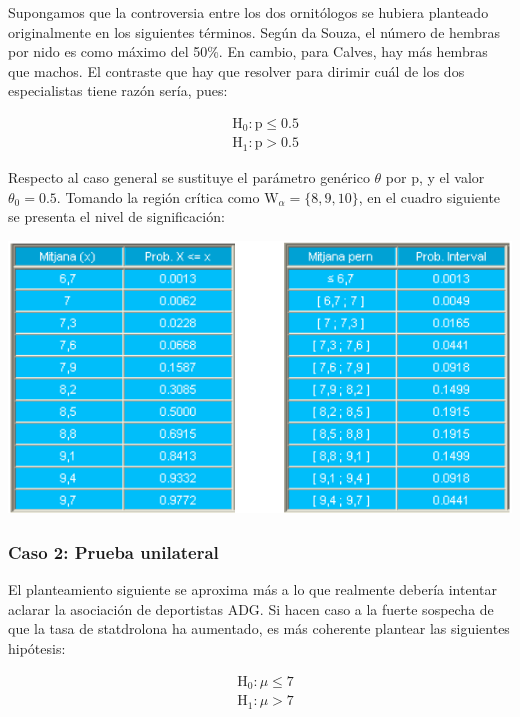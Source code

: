 \documentclass[
]{article}
\begin{document}
Supongamos que la controversia entre los dos ornitólogos se hubiera planteado originalmente en los siguientes términos. Según da Souza, el número de hembras por nido es como máximo del 50\%. En cambio, para Calves, hay más hembras que machos. El contraste que hay que resolver para dirimir cuál de los dos especialistas tiene razón sería, pues:

\[
\begin{aligned}
& \mathrm{H}_{0}: \mathrm{p} \leq 0.5 \\
& \mathrm{H}_{1}: \mathrm{p}>0.5
\end{aligned}
\]

Respecto al caso general se sustituye el parámetro genérico \(\theta\) por p, y el valor \(\theta_{0}=0.5\). Tomando la región crítica como \(\mathrm{W}_{\alpha}=\{8,9,10\}\), en el cuadro siguiente se presenta el nivel de significación:

\begin{center}\includegraphics[width=0.9\linewidth]{images/cap9-comparaProbs} \end{center}

\subsubsection{Caso 2: Prueba unilateral}\label{caso-2-prueba-unilateral}

El planteamiento siguiente se aproxima más a lo que realmente debería intentar aclarar la asociación de deportistas ADG. Si hacen caso a la fuerte sospecha de que la tasa de statdrolona ha aumentado, es más coherente plantear las siguientes hipótesis:

\[
\begin{aligned}
& \mathrm{H}_{0}: \mu \leq 7 \\
& \mathrm{H}_{1}: \mu>7
\end{aligned}
\]
\end{document}
